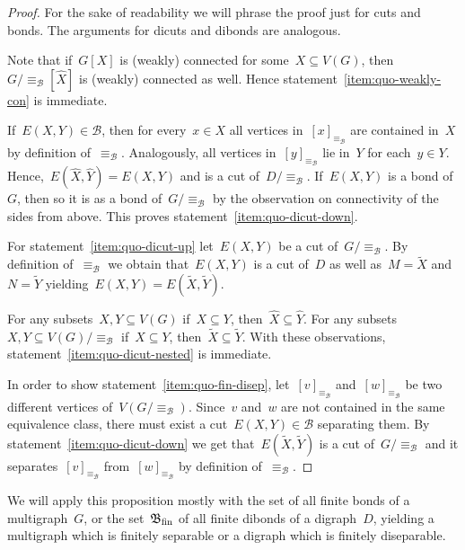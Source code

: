 \documentclass[reqno, 12pt]{amsart}
\numberwithin{equation}{section}
\numberwithin{figure}{section}
\theoremstyle{plain}
\theoremstyle{definition}
\begin{document}
\begin{proof}
    For the sake of readability we will phrase the proof just for cuts and bonds. 
    The arguments for dicuts and dibonds are analogous. 
    
    Note that if~${G[X]}$ is (weakly) connected for some~${X \subseteq V(G)}$, then~${G{/}\equiv_\mathcal{B}[\hat{X}]}$ is (weakly) connected as well. 
    Hence statement~\ref{item:quo-weakly-con} is immediate. 

    If~${E(X, Y) \in \mathcal{B}}$, then for every~${x \in X}$ all vertices in~${[x]_{\equiv_\mathcal{B}}}$ are contained in~$X$ by definition of~$\equiv_\mathcal{B}$.
    Analogously, all vertices in~${[y]_{\equiv_\mathcal{B}}}$ lie in~$Y$ for each~${y \in Y}$.
    Hence,~${E(\hat{X}, \hat{Y}) = E(X, Y)}$ and is a cut of~${D{/}{\equiv_\mathcal{B}}}$. 
    If~${E(X,Y)}$ is a bond of~$G$, then so it is as a bond of~$G{/}\equiv_\mathcal{B}$ by the observation on connectivity of the sides from above. 
    This proves statement~\ref{item:quo-dicut-down}. 

    For statement~\ref{item:quo-dicut-up} 
    let~${E(X, Y)}$ be a cut of~${G{/}{\equiv_\mathcal{B}}}$.
    By definition of~$\equiv_\mathcal{B}$ we obtain that~${E(X, Y)}$ is a cut of~$D$ as well as~${M = \tilde{X}}$ and~${N = \tilde{Y}}$ yielding~${E(X, Y) = E(\tilde{X}, \tilde{Y})}$. 
    
    For any subsets~${X, Y \subseteq V(G)}$ if~${X \subseteq Y}$, then~${\hat{X} \subseteq \hat{Y}}$. 
    For any subsets~${X, Y \subseteq V(G){/}{\equiv_\mathcal{B}}}$ if~${X \subseteq Y}$, then~${\tilde{X} \subseteq \tilde{Y}}$.
    With these observations, statement~\ref{item:quo-dicut-nested} is immediate. 

    In order to show statement~\ref{item:quo-fin-disep}, let~$[v]_{\equiv_\mathcal{B}}$ and~$[w]_{\equiv_\mathcal{B}}$ be two different vertices of~${V(G{/}{\equiv_\mathcal{B}})}$. 
    Since~$v$ and~$w$ are not contained in the same equivalence class, there must exist a cut~${E(X, Y)} \in \mathcal{B}$ separating them. 
    By statement~\ref{item:quo-dicut-down} we get that~${E(\tilde{X}, \tilde{Y})}$ is a cut of~$G{/}{\equiv_\mathcal{B}}$ and it separates~$[v]_{\equiv_\mathcal{B}}$ from~$[w]_{\equiv_\mathcal{B}}$ by definition of~$\equiv_\mathcal{B}$.
\end{proof}

We will apply this proposition mostly with the set of all finite bonds of a multigraph~$G$, or the set~$\mathfrak{B}_\textnormal{fin}$ of all finite dibonds of a digraph~$D$, yielding a multigraph which is finitely separable or a digraph which is finitely diseparable.
\end{document}
